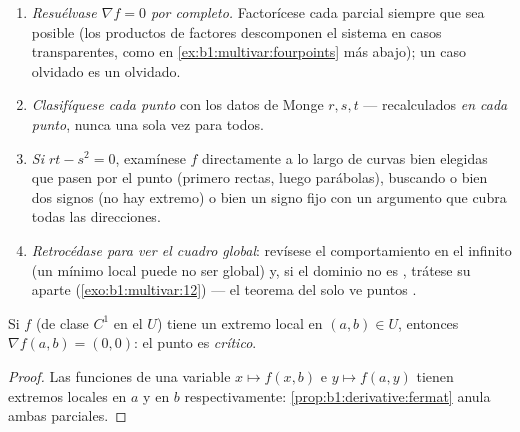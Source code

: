 \begin{method}
\label{met:b1:multivar:extremamethod}
\begin{enumerate}
  \item \emph{Resuélvase $\nabla f = 0$ por completo.} Factorícese cada
        parcial siempre que sea posible (los productos de factores 
        descomponen el sistema en casos transparentes, como en
        \cref{ex:b1:multivar:fourpoints} más abajo); un caso
        olvidado es un  olvidado.
  \item \emph{Clasifíquese cada punto} con los datos de Monge $r, s,
        t$ --- recalculados \emph{en cada punto}, nunca una sola vez
        para todos.
  \item \emph{Si $rt - s^2 = 0$}, examínese $f$ directamente a lo
        largo de curvas bien elegidas que pasen por el punto (primero
        rectas, luego parábolas), buscando o bien dos signos (no hay
        extremo) o bien un signo fijo con un argumento que cubra todas
        las direcciones.
  \item \emph{Retrocédase para ver el cuadro global}: revísese el
        comportamiento en el infinito (un mínimo local puede no ser
        global) y, si el dominio no es , trátese su 
        aparte (\cref{exo:b1:multivar:12}) --- el teorema del  solo ve puntos .
\end{enumerate}
\end{method}

\begin{theorem}\label{thm:b1:multivar:critical}
Si $f$ (de clase $C^1$ en el  $U$) tiene un extremo local en $(a,b)
\in U$, entonces $\nabla f(a,b) = (0,0)$: el punto es
\emph{crítico}.
\end{theorem}

\begin{proof}
Las funciones de una variable $x \mapsto f(x, b)$ e $y \mapsto f(a,
y)$ tienen extremos locales  en $a$ y en $b$ respectivamente:
\cref{prop:b1:derivative:fermat} anula ambas parciales.
\end{proof}

